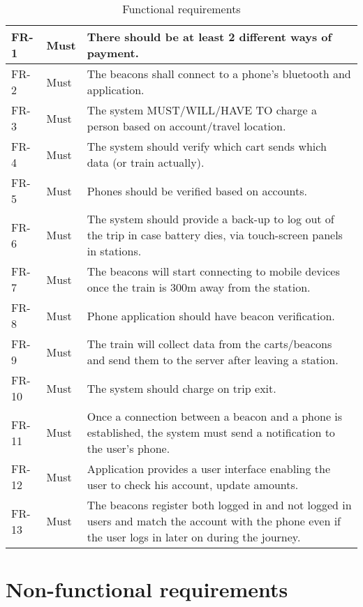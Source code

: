 {
  \renewcommand{\arraystretch}{1.5}
  \begin{table}[H]
    \centering
    \begin{tabularx}{\linewidth}{l|l|X}
     	FR-1 & Must & There should be at least 2 different ways of payment. \\ \hline
     	FR-2 & Must & The beacons shall connect to a phone's bluetooth and application.\\ \hline
     	FR-3 & Must & The system MUST/WILL/HAVE TO charge a person based on account/travel location. \\
     	\hline
     	FR-4 & Must & The system should verify which cart sends which data (or train actually). \\
     	\hline
     	FR-5 & Must & Phones should be verified based on accounts.\\ \hline        
     	FR-6 & Must & The system should provide a back-up to log out of the trip in case battery dies, via touch-screen panels in stations.\\ \hline
     	FR-7 & Must & The beacons will start connecting to mobile devices once the train is 300m away from the station.\\ \hline
    	FR-8 & Must & Phone application should have beacon verification.\\	\hline
	    FR-9 & Must & The train will collect data from the carts/beacons and send them to the server  after leaving a station. \\ 	\hline
	    FR-10 & Must & The system should charge on trip exit.\\ 	\hline
    	FR-11 & Must & Once a connection between a beacon and a phone is established, the system must send a notification to the user’s phone.\\ 	\hline
	    FR-12 & Must & Application provides a user interface enabling the user to check his account, update amounts.
        \\	\hline
	    FR-13 & Must & The beacons register both logged in and not logged in users and match the account with the phone even if the user logs in later on during the journey. \\

    \end{tabularx}
    \caption{Functional requirements}
  \end{table}
}

\section{Non-functional requirements}

